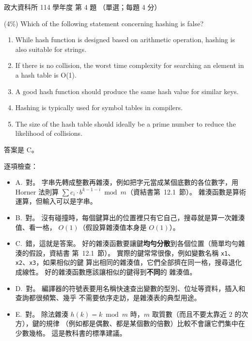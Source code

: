 \begin{pastexam}[label={px:nccu-114-dsa-04}]{政大資科所 114 學年度 第 4 題}
（單選；每題 4 分）

(4\%) Which of the following statement concerning hashing is false?
\begin{enumerate}[label=\Alph*.]
\item While hash function is designed based on arithmetic operation, hashing is also suitable for
strings.
\item If there is no collision, the worst time complexity for searching an element in a hash table
is O(1).
\item A good hash function should produce the same hash value for similar keys.
\item Hashing is typically used for symbol tables in compilers.
\item The size of the hash table should ideally be a prime number to reduce the likelihood of
collisions.
\end{enumerate}
\end{pastexam}

\begin{pastsoln}
答案是 C。

逐項檢查：
\begin{itemize}
\item A.~對。 字串先轉成整數再雜湊，例如把字元當成某個底數的各位數字，用 Horner 法則算
$\sum c_i \cdot b^{k-1-i} \bmod m$（資結書第~12.1~節）。 雜湊函數是算術運算，但輸入可以是字串。
\item B.~對。 沒有碰撞時，每個鍵算出的位置裡只有它自己，搜尋就是算一次雜湊值、看一格，
$O(1)$（假設算雜湊值本身是 $O(1)$）。
\item C.~錯，這就是答案。 好的雜湊函數要讓鍵\textbf{均勻分散}到各個位置（簡單均勻雜湊的假設，資結書
第~12.1~節）。 實際的鍵常常很像，例如變數名稱 \texttt{x1}、\texttt{x2}、\texttt{x3}，如果相似的鍵
算出相同的雜湊值，它們全部擠在同一格，搜尋退化成線性。 好的雜湊函數應該讓相似的鍵得到\textbf{不同}的
雜湊值。
\item D.~對。 編譯器的符號表要用名稱快速查出變數的型別、位址等資料，插入和查詢都很頻繁、幾乎
不需要依序走訪，是雜湊表的典型用途。
\item E.~對。 除法雜湊 $h(k) = k \bmod m$ 時，$m$ 取質數（而且不要太靠近 $2$ 的次方），鍵的規律
（例如都是偶數、都是某個數的倍數）比較不會讓它們集中在少數幾格。 這是教科書的標準建議。
\end{itemize}
\end{pastsoln}
